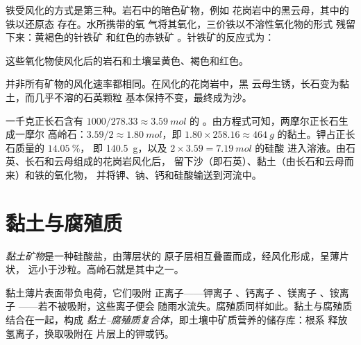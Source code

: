 铁受风化的方式是第三种。岩石中的暗色矿物，例如
花岗岩中的黑云母，其中的铁以还原态  存在。水所携带的氧
气将其氧化，三价铁以不溶性氧化物的形式
残留下来：黄褐色的针铁矿  和红色的赤铁矿
。针铁矿的反应式为：
\begin{center}
\end{center}
这些氧化物使风化后的岩石和土壤呈黄色、褐色和红色。

并非所有矿物的风化速率都相同。在风化的花岗岩中，黑
云母生锈，长石变为黏土，而几乎不溶的石英颗粒
基本保持不变，最终成为沙。

\begin{example}[花岗岩的风化]\label{ex:g10:soil-formation:granite}
一千克正长石含有 $1000/278.33 \approx \qty{3.59}{mol}$ 的
。由方程式可知，两摩尔正长石生成一摩尔
高岭石：$3.59/2 \approx \qty{1.80}{mol}$，即 $1.80 \times 258.16
\approx \qty{464}{g}$ 的黏土。钾占正长石质量的 $14.05~\%$，
即 \qty{140.5}{g}，以及 $2 \times 3.59 = \qty{7.19}{mol}$ 的硅酸
进入溶液。由石英、长石和云母组成的花岗岩风化后，
留下沙（即石英）、黏土（由长石和云母而来）和铁的氧化物，
并将钾、钠、钙和硅酸输送到河流中。
\end{example}

\section{黏土与腐殖质}

\begin{definition}[黏土矿物]\label{def:g10:soil-formation:clay}
\emph{黏土矿物}是一种硅酸盐，由薄层状的
原子层相互叠置而成，经风化形成，呈薄片状，
远小于沙粒。高岭石就是其中之一。
\end{definition}

黏土薄片表面带负电荷，它们吸附
正离子——钾离子 、钙离子 、镁离子
、铵离子 ——若不被吸附，这些离子便会
随雨水流失。腐殖质同样如此。黏土与腐殖质结合在一起，构成
\emph{黏土–腐殖质复合体}，即土壤中矿质营养的储存库：根系
释放氢离子，换取吸附在
片层上的钾或钙。

